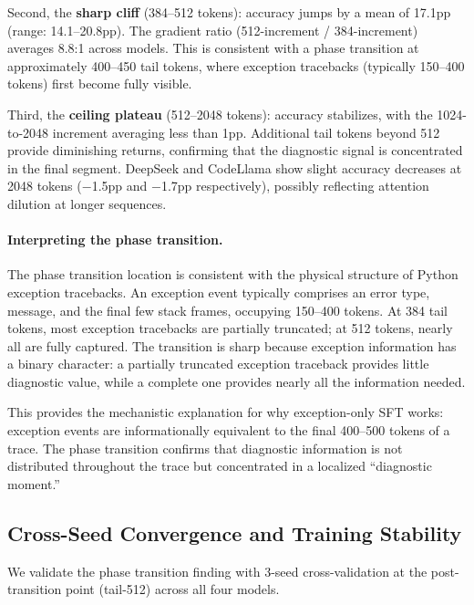 \documentclass[11pt,a4paper]{article}
\begin{document}
Second, the \textbf{sharp cliff} (384--512 tokens): accuracy jumps by a mean of 17.1pp (range: 14.1--20.8pp). The gradient ratio (512-increment / 384-increment) averages 8.8:1 across models. This is consistent with a phase transition at approximately 400--450 tail tokens, where exception tracebacks (typically 150--400 tokens) first become fully visible.

Third, the \textbf{ceiling plateau} (512--2048 tokens): accuracy stabilizes, with the 1024-to-2048 increment averaging less than 1pp. Additional tail tokens beyond 512 provide diminishing returns, confirming that the diagnostic signal is concentrated in the final segment. DeepSeek and CodeLlama show slight accuracy decreases at 2048 tokens ($-$1.5pp and $-$1.7pp respectively), possibly reflecting attention dilution at longer sequences.

\paragraph{Interpreting the phase transition.}
The phase transition location is consistent with the physical structure of Python exception tracebacks. An exception event typically comprises an error type, message, and the final few stack frames, occupying 150--400 tokens. At 384 tail tokens, most exception tracebacks are partially truncated; at 512 tokens, nearly all are fully captured. The transition is sharp because exception information has a binary character: a partially truncated exception traceback provides little diagnostic value, while a complete one provides nearly all the information needed.

This provides the mechanistic explanation for why exception-only SFT works: exception events are informationally equivalent to the final 400--500 tokens of a trace. The phase transition confirms that diagnostic information is not distributed throughout the trace but concentrated in a localized ``diagnostic moment.''

\subsection{Cross-Seed Convergence and Training Stability}
\label{sec:training_stability}

We validate the phase transition finding with 3-seed cross-validation at the post-transition point (tail-512) across all four models.
\end{document}
